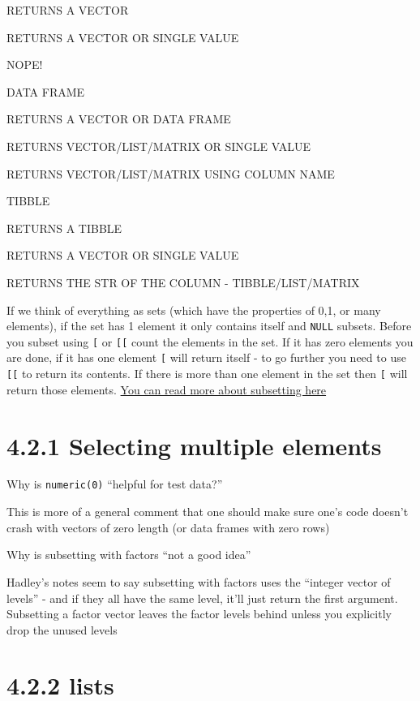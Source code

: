 \documentclass[]{book}
\begin{document}
RETURNS A VECTOR

RETURNS A VECTOR OR SINGLE VALUE

NOPE!

DATA FRAME

RETURNS A VECTOR OR DATA FRAME

RETURNS VECTOR/LIST/MATRIX OR SINGLE VALUE

RETURNS VECTOR/LIST/MATRIX USING COLUMN NAME

TIBBLE

RETURNS A TIBBLE

RETURNS A VECTOR OR SINGLE VALUE

RETURNS THE STR OF THE COLUMN - TIBBLE/LIST/MATRIX

If we think of everything as sets (which have the properties of 0,1, or many elements), if the set has 1 element it only contains itself and \texttt{NULL} subsets. Before you subset using \texttt{{[}} or \texttt{{[}{[}} count the elements in the set. If it has zero elements you are done, if it has one element \texttt{{[}} will return itself - to go further you need to use \texttt{{[}{[}} to return its contents. If there is more than one element in the set then \texttt{{[}} will return those elements. \href{https://bookdown.org/rdpeng/rprogdatascience/subsetting-r-objects.html\#subsetting-a-vector}{You can read more about subsetting here}

\hypertarget{selecting-multiple-elements}{%
\section*{4.2.1 Selecting multiple elements}\label{selecting-multiple-elements}}

Why is \texttt{numeric(0)} ``helpful for test data?''

This is more of a general comment that one should make sure one's code doesn't crash with vectors of zero length (or data frames with zero rows)

Why is subsetting with factors ``not a good idea''

Hadley's notes seem to say subsetting with factors uses the ``integer vector of levels'' - and if they all have the same level, it'll just return the first argument. Subsetting a factor vector leaves the factor levels behind unless you explicitly drop the unused levels

\hypertarget{lists-2}{%
\section*{4.2.2 lists}\label{lists-2}}
\end{document}
